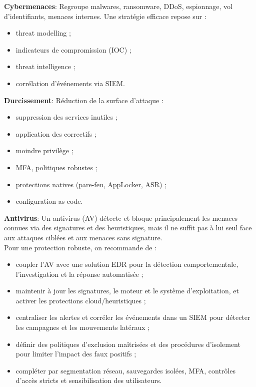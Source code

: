 \newpage

\noindent \textbf{Cybermenaces}:
Regroupe malwares, ransomware, DDoS, espionnage, vol d'identifiants, menaces internes.  
Une stratégie efficace repose sur :
\begin{itemize}
    \item threat modelling ;
    \item indicateurs de compromission (IOC) ;
    \item threat intelligence ;
    \item corrélation d'événements via SIEM.
\end{itemize}

\vspace{0.5cm}

\noindent \textbf{Durcissement}:
Réduction de la surface d'attaque :
\begin{itemize}
    \item suppression des services inutiles ;
    \item application des correctifs ;
    \item moindre privilège ;
    \item MFA, politiques robustes ;
    \item protections natives (pare-feu, AppLocker, ASR) ;
    \item configuration as code.
\end{itemize}

\vspace{0.5cm}

\noindent \textbf{Antivirus}:
Un antivirus (AV) détecte et bloque principalement les menaces connues via des signatures et des heuristiques, mais il ne suffit pas à lui seul face aux attaques ciblées et aux menaces sans signature. \\
Pour une protection robuste, on recommande de :
\begin{itemize}
  \item coupler l'AV avec une solution EDR pour la détection comportementale, l'investigation et la réponse automatisée ;
  \item maintenir à jour les signatures, le moteur et le système d'exploitation, et activer les protections cloud/heuristiques ;
  \item centraliser les alertes et corréler les événements dans un SIEM pour détecter les campagnes et les mouvements latéraux ;
  \item définir des politiques d'exclusion maîtrisées et des procédures d'isolement pour limiter l'impact des faux positifs ;
  \item compléter par segmentation réseau, sauvegardes isolées, MFA, contrôles d'accès stricts et sensibilisation des utilisateurs.
\end{itemize}

